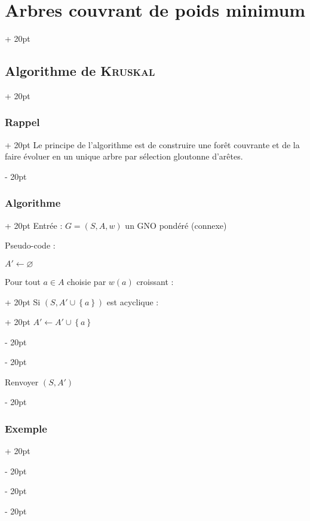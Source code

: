 \documentclass[a4paper, 12pt, twoside]{article}
\newcommand{\set}[1]{\left\{ #1 \right\}}
\newcommand{\ind}[1][20pt]{\advance\leftskip + #1}
\newcommand{\deind}[1][20pt]{\advance\leftskip - #1}
\newenvironment{indt}[2][20pt]{#2 \par \ind[#1]}{\par \deind} %
\begin{document}
\begin{indt}{\section{Arbres couvrant de poids minimum}}
\begin{indt}{\subsection{Algorithme de \textsc{Kruskal}}}
\begin{indt}{\subsubsection{Rappel}}
                Le principe de l'algorithme est de construire une forêt couvrante et de la faire évoluer en un unique arbre par sélection gloutonne d'arêtes.
            \end{indt}

            \vspace{12pt}
            
            \begin{indt}{\subsubsection{Algorithme}}
                Entrée : $G = (S, A, w)$ un GNO pondéré (connexe)

                Pseudo-code :
                \begin{pseudocode}
                    $A' \leftarrow \varnothing$

                    \begin{indt}{Pour tout $a \in A$ choisie par $w(a)$ croissant :}
                        \begin{indt}{Si $(S, A' \cup \set a)$ est acyclique :}
                            $A' \leftarrow A' \cup \set a$
                        \end{indt}
                    \end{indt}

                    \vspace{6pt}
                    
                    Renvoyer $(S, A')$
                \end{pseudocode}
            \end{indt}

            \vspace{12pt}
            
            \begin{indt}{\subsubsection{Exemple}}
                \begin{center}
\end{center}
\end{indt}
\end{indt}
\end{indt}
\end{document}

